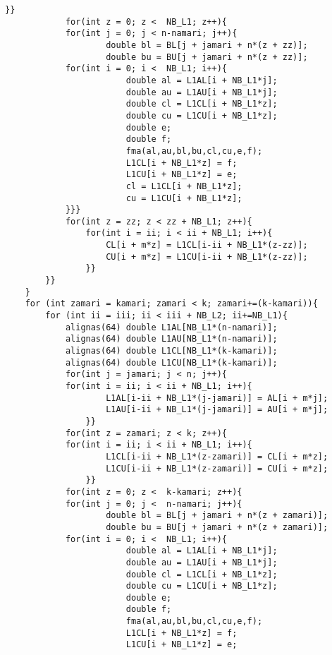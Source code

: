 \documentclass[11pt,a4paper]{jsreport}
\theoremstyle{definition}
\begin{document}
\begin{lstlisting}[caption = 本研究で使用したプログラム]
                }}
            for(int z = 0; z <  NB_L1; z++){
            for(int j = 0; j < n-namari; j++){
                    double bl = BL[j + jamari + n*(z + zz)];
                    double bu = BU[j + jamari + n*(z + zz)];
            for(int i = 0; i <  NB_L1; i++){
                        double al = L1AL[i + NB_L1*j];
                        double au = L1AU[i + NB_L1*j];
                        double cl = L1CL[i + NB_L1*z];
                        double cu = L1CU[i + NB_L1*z];
                        double e;
                        double f;
                        fma(al,au,bl,bu,cl,cu,e,f);
                        L1CL[i + NB_L1*z] = f;
                        L1CU[i + NB_L1*z] = e;
                        cl = L1CL[i + NB_L1*z];
                        cu = L1CU[i + NB_L1*z];
            }}}
            for(int z = zz; z < zz + NB_L1; z++){
                for(int i = ii; i < ii + NB_L1; i++){
                    CL[i + m*z] = L1CL[i-ii + NB_L1*(z-zz)];
                    CU[i + m*z] = L1CU[i-ii + NB_L1*(z-zz)];
                }}
        }}
    }
    for (int zamari = kamari; zamari < k; zamari+=(k-kamari)){
        for (int ii = iii; ii < iii + NB_L2; ii+=NB_L1){
            alignas(64) double L1AL[NB_L1*(n-namari)];
            alignas(64) double L1AU[NB_L1*(n-namari)];
            alignas(64) double L1CL[NB_L1*(k-kamari)];
            alignas(64) double L1CU[NB_L1*(k-kamari)];
            for(int j = jamari; j < n; j++){
            for(int i = ii; i < ii + NB_L1; i++){
                    L1AL[i-ii + NB_L1*(j-jamari)] = AL[i + m*j];
                    L1AU[i-ii + NB_L1*(j-jamari)] = AU[i + m*j];
                }}
            for(int z = zamari; z < k; z++){
            for(int i = ii; i < ii + NB_L1; i++){
                    L1CL[i-ii + NB_L1*(z-zamari)] = CL[i + m*z];
                    L1CU[i-ii + NB_L1*(z-zamari)] = CU[i + m*z];
                }}
            for(int z = 0; z <  k-kamari; z++){
            for(int j = 0; j <  n-namari; j++){
                    double bl = BL[j + jamari + n*(z + zamari)];
                    double bu = BU[j + jamari + n*(z + zamari)];
            for(int i = 0; i <  NB_L1; i++){
                        double al = L1AL[i + NB_L1*j];
                        double au = L1AU[i + NB_L1*j];
                        double cl = L1CL[i + NB_L1*z];
                        double cu = L1CU[i + NB_L1*z];
                        double e;
                        double f;
                        fma(al,au,bl,bu,cl,cu,e,f);
                        L1CL[i + NB_L1*z] = f;
                        L1CU[i + NB_L1*z] = e;

\end{lstlisting}
\end{document}
